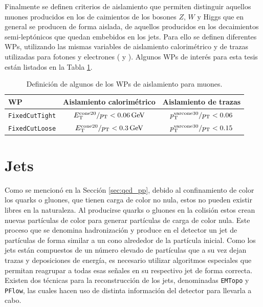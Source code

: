 Finalmente se definen criterios de aislamiento que permiten distinguir aquellos muones producidos en los de caimientos de los bosones $Z$, $W$ y Higgs que en general se producen de forma aislada, de aquellos producidos en los decaimientos semi-leptónicos que quedan embebidos en los jets. Para ello se definen diferentes
WPs, utilizando las mismas variables de aislamiento calorimétrico y de trazas utilizadas para fotones y electrones ( y ). Algunos WPs de interés para esta tesis están listados en la {Tabla \ref{tab:muon_WPs}}.

\begin{table} 
\centering
\caption{Definición de algunos de los WPs de aislamiento para muones. 
}
  \begin{tabular}{ l c c}

  \hline
  \hline

    WP & Aislamiento calorimétrico & Aislamiento de trazas \\

    \hline
    \hline

    \texttt{FixedCutTight} & $E_{\text{T}}^{\text{cone20}}/p_{\text{T}} < 0.06\,\text{GeV}$ & $p_{\text{T}}^{\text{varcone30}}/p_{\text{T}}<0.06$ \\

    \texttt{FixedCutLoose} & $E_{\text{T}}^{\text{cone20}}/p_{\text{T}} < 0.3\,\text{GeV}$  & $p_{\text{T}}^{\text{varcone30}}/p_{\text{T}}<0.15$ \\



    \hline
    \hline

  \end{tabular}
\label{tab:muon_WPs}
\end{table}

\section{Jets}

Como se mencionó en la Sección \ref{sec:qcd_pp}, debido al confinamiento de color los quarks o gluones, que tienen carga de color no nula, estos no pueden existir libres en la naturaleza. Al producirse quarks o gluones en la colisión estos crean nuevas partículas de color para generar partículas de carga de color nula. Este proceso que se denomina hadronización y produce en el detector un jet de partículas de forma similar a un cono alrededor de la partícula inicial. Como los jets están compuestos de un número elevado de partículas que a su vez dejan trazas y deposiciones de energía, es necesario utilizar algoritmos especiales que permitan reagrupar a todas esas señales en su respectivo jet de forma correcta. Existen dos técnicas para la reconstrucción de los jets, denominadas \texttt{EMTopo} y \texttt{PFlow}, las cuales hacen uso de distinta información del detector para llevarla a cabo. 

